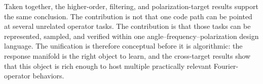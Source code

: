 Taken together, the higher-order, filtering, and polarization-target results support the same conclusion. The contribution is not that one code path can be pointed at several unrelated operator tasks. The contribution is that those tasks can be represented, sampled, and verified within one angle--frequency--polarization design language. The unification is therefore conceptual before it is algorithmic: the response manifold is the right object to learn, and the cross-target results show that this object is rich enough to host multiple practically relevant Fourier-operator behaviors.
